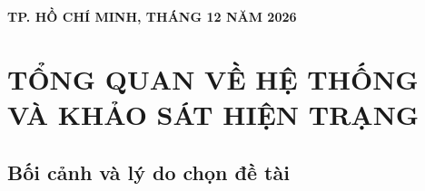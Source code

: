 \documentclass[12pt,a4paper]{article}
\begin{document}
\begin{titlepage}
    \vspace{1.0cm}
    \begin{center}
        \textbf{TP. HỒ CHÍ MINH, THÁNG 12 NĂM 2026}
    \end{center}
\end{titlepage}

\newpage
{}
\setcounter{page}{1}

\tableofcontents %

\newpage
\listoffigures %

\newpage
\listoftables %

\newpage
{}
\setcounter{page}{1}

\section{TỔNG QUAN VỀ HỆ THỐNG VÀ KHẢO SÁT HIỆN TRẠNG}
\label{sec:tong-quan-he-thong}

\subsection{Bối cảnh và lý do chọn đề tài}
\label{subsec:boi-canh}
\end{document}
